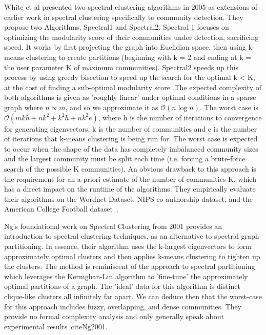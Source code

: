 \par{White et al presented two spectral clustering algorithms in 2005 as extensions of earlier work in spectral clustering specifically to community detection. 
They propose two Algorithms, Spectral1 and Spectral2. 
Spectral 1 focuses on optimizing the modularity score of their communities under detection, sacrificing speed. It works by first projecting the graph into Euclidian space, then using k-means clustering to create partitions (beginning with k = 2 and ending at k = the user parameter K of maximum communities). 
Spectral2 speeds up this process by using greedy bisection to speed up the search for the optimal k < K, at the cost of finding a sub-optimal modularity score. 
The expected complexity of both algorithms is given as 'roughly linear' under optimal conditions in a sparse graph where $n \propto m$, and so we approximate it as $\mathcal{O}(n\log{n})$. 
The worst case is $\mathcal{O}(mkh+nk^2+k^2h+nk^2e)$, where h is the number of iterations to convergence for generating eigenvectors, k is the number of communities and e is the number of iterations that k-means clustering is being run for. 
The worst case is expected to occur when the shape of the data has completely imbalanced community sizes and the largest community must be split each time (i.e. forcing a brute-force search of the possible K communities). 
An obvious drawback to this approach is the requirement for an a-priori estimate of the number of communities K, which has a direct impact on the runtime of the algorithms. 
They empirically evaluate their algorithms on the Wordnet Dataset, NIPS co-authorship dataset, and the American College Football dataset~\cite{White2005}.}

\par{Ng's foundational work on Spectral Clustering from 2001 provides an introduction to spectral clustering techniques, as an alternative to spectral graph partitioning. 
In essence, their algorithm uses the k-largest eigenvectors to form approximately optimal clusters and then applies k-means clustering to tighten up the clusters. 
The method is reminiscent of the approach to spectral partitioning which leverages the Kernighan-Lin algorithm to 'fine-tune' the approximately optimal partitions of a graph. 
The 'ideal' data for this algorithm is distinct clique-like clusters all infinitely far apart. 
We can deduce then that the worst-case for this approach includes fuzzy, overlapping, and dense communities. 
They provide no formal complexity analysis and only generally speak about experimental results~cite{Ng2001}.}

